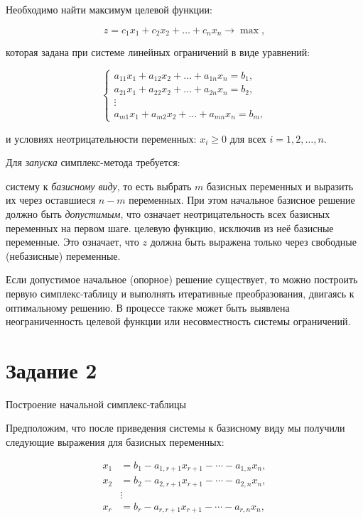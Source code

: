 \documentclass{report}
\begin{document}
	Необходимо найти максимум целевой функции:
	
	\[ z = c_1x_1 + c_2x_2 + \dots + c_nx_n \rightarrow \max, \]
	
	которая задана при системе линейных ограничений в виде уравнений:
	
	\[
	\begin{cases}
		a_{11}x_1 + a_{12}x_2 + \dots + a_{1n}x_n = b_1, \\
		a_{21}x_1 + a_{22}x_2 + \dots + a_{2n}x_n = b_2, \\
		\vdots \\
		a_{m1}x_1 + a_{m2}x_2 + \dots + a_{mn}x_n = b_m,
	\end{cases}
	\]
	
	и условиях неотрицательности переменных: \( x_i \geq 0 \) для всех \( i = 1, 2, \dots, n \).
	
	
	Для \textit{запуска} симплекс-метода требуется: 
	\begin{enumerate} 
	 систему к \textit{базисному виду}, то есть выбрать \( m \) базисных переменных и выразить их через оставшиеся \( n - m \) переменных. При этом начальное базисное решение должно быть \textit{допустимым}, что означает неотрицательность всех базисных переменных на первом шаге.
	 целевую функцию, исключив из неё базисные переменные. Это означает, что \( z \) должна быть выражена только через свободные (небазисные) переменные.  
	
	Если допустимое начальное (опорное) решение существует, то можно построить первую симплекс-таблицу и выполнять итеративные преобразования, двигаясь к оптимальному решению. В процессе также может быть выявлена неограниченность целевой функции или несовместность системы ограничений.
	\end{enumerate}
	
	\chapter{Задание 2}
	
	Построение начальной симплекс-таблицы
	
	Предположим, что после приведения системы к базисному виду мы получили следующие выражения для базисных переменных:
	
	\[
	\begin{aligned}
		x_{1} &= b_{1} - a_{1,r+1}x_{r+1} - \cdots - a_{1,n}x_{n}, \\
		x_{2} &= b_{2} - a_{2,r+1}x_{r+1} - \cdots - a_{2,n}x_{n}, \\
		&\vdots \\
		x_{r} &= b_{r} - a_{r,r+1}x_{r+1} - \cdots - a_{r,n}x_{n},
	\end{aligned}
	\]
	
\end{document}
